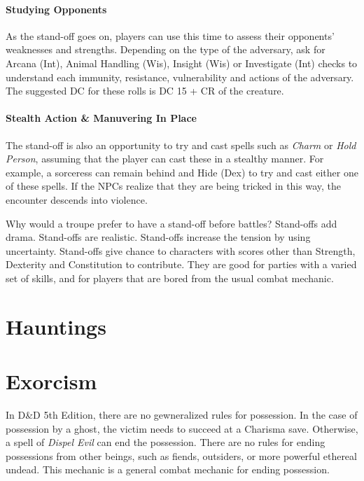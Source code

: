 \documentclass[twocolumn]{dndbook}
\begin{document}
\paragraph*{Studying Opponents}
As the stand-off goes on, players can use this time to assess their opponents' weaknesses and strengths.
Depending on the type of the adversary, ask for Arcana (Int), Animal Handling (Wis), Insight (Wis) or Investigate (Int) checks to understand each immunity, resistance, vulnerability and actions of the adversary.
The suggested DC for these rolls is DC 15 + CR of the creature.\par

\paragraph*{Stealth Action \& Manuvering In Place}
The stand-off is also an opportunity to try and cast spells such as \emph{Charm} or \emph{Hold Person}, assuming that the player can cast these in a stealthy manner.
For example, a sorceress can remain behind and Hide (Dex) to try and cast either one of these spells.
If the NPCs realize that they are being tricked in this way, the encounter descends into violence.\par

\begin{emphasisParagraph}
	Why would a troupe prefer to have a stand-off before battles?
	Stand-offs add drama. Stand-offs are realistic.
	Stand-offs increase the tension by using uncertainty.
	Stand-offs give chance to characters with scores other than Strength, Dexterity and Constitution to contribute.
	They are good for parties with a varied set of skills, and for players that are bored from the usual combat mechanic.\par
\end{emphasisParagraph}

\section{Hauntings}

\section{Exorcism}

In D\&D 5th Edition, there are no gewneralized rules for possession.
In the case of possession by a ghost, the victim needs to succeed at a Charisma save.
Otherwise, a spell of \emph{Dispel Evil} can end the possession.
There are no rules for ending possessions from other beings, such as fiends, outsiders, or more powerful ethereal undead.
This mechanic is a general combat mechanic for ending possession.\par
\end{document}
